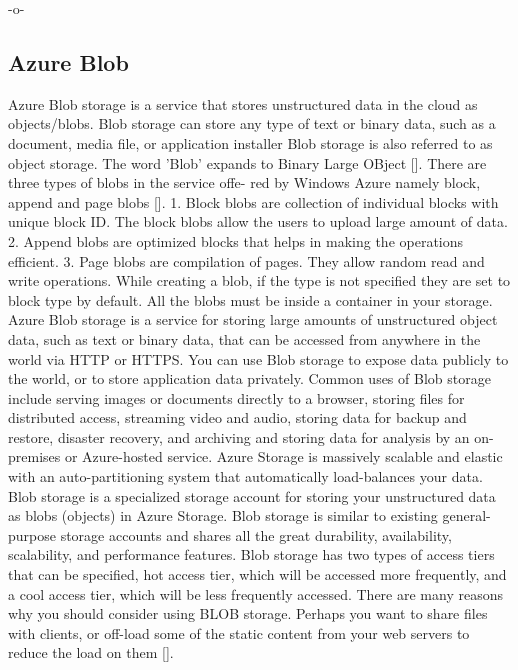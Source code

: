     -o-

  
\subsection{Azure Blob}

Azure Blob storage is a service that stores unstructured data in the
cloud as objects/blobs. Blob storage can store any type of text or
binary data, such as a document, media file, or application installer
Blob storage is also referred to as object storage. The word 'Blob'
expands to Binary Large OBject [\cite{www-azure-3}]. There are three
types of blobs in the service offe- red by Windows Azure namely block,
append and page blobs [\cite{www-azure-2}].  1. Block blobs are
collection of individual blocks with unique block ID.  The block blobs
allow the users to upload large amount of data.  2. Append blobs are
optimized blocks that helps in making the operations efficient.
3. Page blobs are compilation of pages. They allow random read and
write operations. While creating a blob, if the type is not specified
they are set to block type by default. All the blobs must be inside a
container in your storage.  Azure Blob storage is a service for
storing large amounts of unstructured object data, such as text or
binary data, that can be accessed from anywhere in the world via HTTP
or HTTPS. You can use Blob storage to expose data publicly to the
world, or to store application data privately. Common uses of Blob
storage include serving images or documents directly to a browser,
storing files for distributed access, streaming video and audio,
storing data for backup and restore, disaster recovery, and archiving
and storing data for analysis by an on-premises or Azure-hosted
service.  Azure Storage is massively scalable and elastic with an
auto-partitioning system that automatically load-balances your
data. Blob storage is a specialized storage account for storing your
unstructured data as blobs (objects) in Azure Storage. Blob storage is
similar to existing general-purpose storage accounts and shares all
the great durability, availability, scalability, and performance
features. Blob storage has two types of access tiers that can be
specified, hot access tier, which will be accessed more frequently,
and a cool access tier, which will be less frequently accessed. There
are many reasons why you should consider using BLOB storage. Perhaps
you want to share files with clients, or off-load some of the static
content from your web servers to reduce the load on
them [\cite{www-azure-3}].

